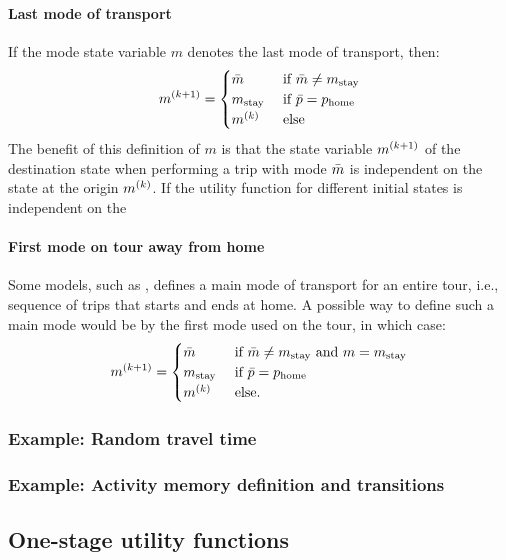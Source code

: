 \paragraph{Last mode of transport}
If the mode state variable $m$ denotes the last mode of transport, then:
\begin{equation}
    m\ks{k+1} = 
    \begin{cases}
        \bar{m} & \cif \bar{m} \neq m_\text{stay} \\
        m_\text{stay} & \cif \act{p} = p_{\text{home}} \\
        m\ks{k} & \celse
    \end{cases}
\end{equation}
The benefit of this definition of $m$ is that the state variable $m^{(k+1)}$ of the destination state when performing a trip with mode $\bar{m}$ is independent on the state at the origin $m^{(k)}$. If the utility function for different initial states is independent on the 

\paragraph{First mode on tour away from home}
Some models, such as \citet{Bowman01}, defines a main mode of transport for an entire tour, i.e., sequence of trips that starts and ends at home. A possible way to define such a main mode would be by the first mode used on the tour, in which case:
\begin{equation}
    m\ks{k+1} = 
    \begin{cases}
        \bar{m} & \cif \bar{m} \neq m_\text{stay} \text{ and } m=m_\text{stay} \\
        m_\text{stay} & \cif \act{p} = p_{\text{home}} \\
        m\ks{k} & \celse.
    \end{cases}
\end{equation}

\subsubsection{Example: Random travel time}

\subsubsection{Example: Activity memory definition and transitions}


\subsection{One-stage utility functions}



